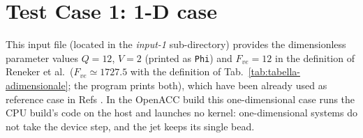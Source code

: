\section{Test Case 1: 1-D case}

This input file (located in the \textit{input-1} sub-directory) provides
the dimensionless parameter values $Q=12$, $V=2$ (printed as \texttt{Phi})
and $F_{ve}=12$ in the definition of Reneker et al.\ ($F_{ve}\simeq1727.5$
with the definition of Tab.~\ref{tab:tabella-adimensionale}; the program
prints both), which have been already used as reference case in Refs \cite{reneker2000bending,pontrelli2014electrospinning}.
In the OpenACC build this one-dimensional case runs the CPU build's code on
the host and launches no kernel: one-dimensional systems do not take the
device step, and the jet keeps its single bead.
